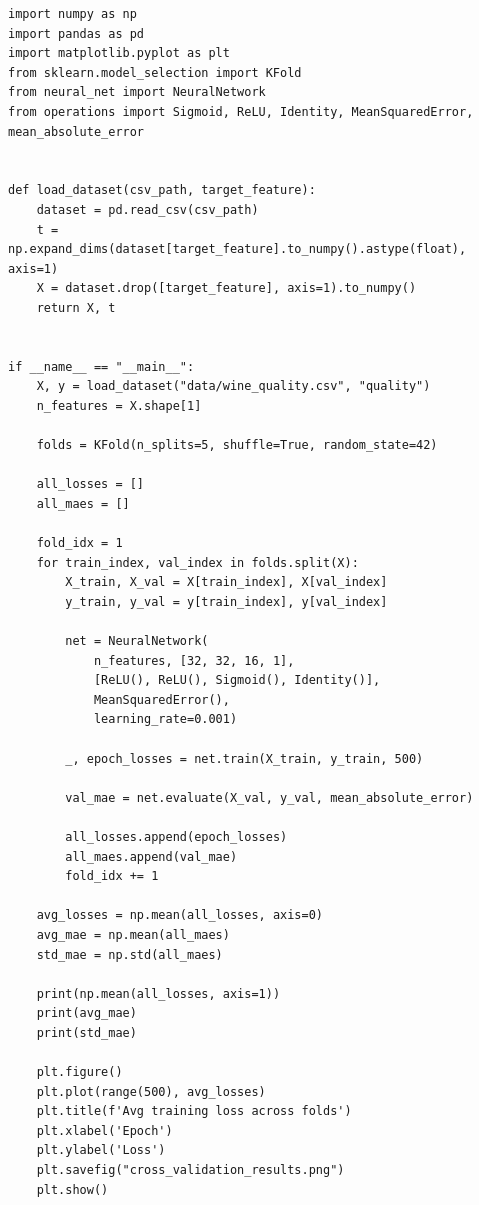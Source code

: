 \documentclass[11pt]{article}
\begin{document}
\begin{verbatim}
import numpy as np
import pandas as pd
import matplotlib.pyplot as plt
from sklearn.model_selection import KFold
from neural_net import NeuralNetwork
from operations import Sigmoid, ReLU, Identity, MeanSquaredError, mean_absolute_error


def load_dataset(csv_path, target_feature):
    dataset = pd.read_csv(csv_path)
    t = np.expand_dims(dataset[target_feature].to_numpy().astype(float), axis=1)
    X = dataset.drop([target_feature], axis=1).to_numpy()
    return X, t


if __name__ == "__main__":
    X, y = load_dataset("data/wine_quality.csv", "quality")
    n_features = X.shape[1]

    folds = KFold(n_splits=5, shuffle=True, random_state=42)

    all_losses = []
    all_maes = []

    fold_idx = 1
    for train_index, val_index in folds.split(X):
        X_train, X_val = X[train_index], X[val_index]
        y_train, y_val = y[train_index], y[val_index]

        net = NeuralNetwork(
            n_features, [32, 32, 16, 1],
            [ReLU(), ReLU(), Sigmoid(), Identity()],
            MeanSquaredError(),
            learning_rate=0.001)

        _, epoch_losses = net.train(X_train, y_train, 500)

        val_mae = net.evaluate(X_val, y_val, mean_absolute_error)

        all_losses.append(epoch_losses)
        all_maes.append(val_mae)
        fold_idx += 1

    avg_losses = np.mean(all_losses, axis=0)
    avg_mae = np.mean(all_maes)
    std_mae = np.std(all_maes)

    print(np.mean(all_losses, axis=1))
    print(avg_mae)
    print(std_mae)

    plt.figure()
    plt.plot(range(500), avg_losses)
    plt.title(f'Avg training loss across folds')
    plt.xlabel('Epoch')
    plt.ylabel('Loss')
    plt.savefig("cross_validation_results.png")
    plt.show()
\end{verbatim}
\end{document}
